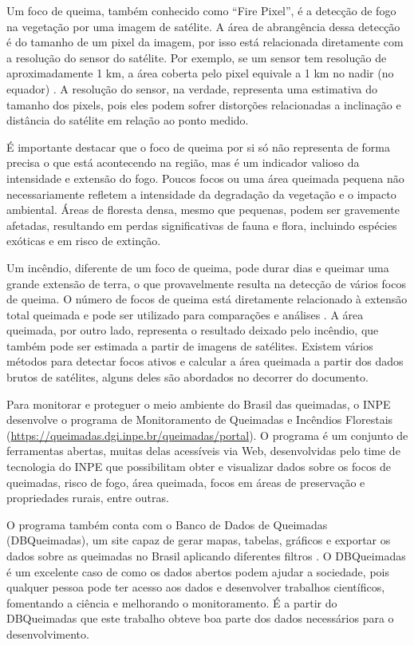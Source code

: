 \documentclass[cic,tc]{iiufrgs}
\begin{document}
Um foco de queima, também conhecido como ``Fire Pixel'', é a detecção de fogo na vegetação por uma imagem de satélite. A área de abrangência dessa detecção é do tamanho de um pixel da imagem, por isso está relacionada diretamente com a resolução do sensor do satélite. Por exemplo, se um sensor tem resolução de aproximadamente 1 km, a área coberta pelo pixel equivale a 1 km no nadir (no equador) \cite{PerguntasFrequentesINPE}. A resolução do sensor, na verdade, representa uma estimativa do tamanho dos pixels, pois eles podem sofrer distorções relacionadas a inclinação e distância do satélite em relação ao ponto medido. 

É importante destacar que o foco de queima por si só não representa de forma precisa o que está acontecendo na região, mas é um indicador valioso da intensidade e extensão do fogo. Poucos focos ou uma área queimada pequena não necessariamente refletem a intensidade da degradação da vegetação e o impacto ambiental. Áreas de floresta densa, mesmo que pequenas, podem ser gravemente afetadas, resultando em perdas significativas de fauna e flora, incluindo espécies exóticas e em risco de extinção.

Um incêndio, diferente de um foco de queima, pode durar dias e queimar uma grande extensão de terra, o que provavelmente resulta na detecção de vários focos de queima. O número de focos de queima está diretamente relacionado à extensão total queimada e pode ser utilizado para comparações e análises \citep{giglio2010assessing}. A área queimada, por outro lado, representa o resultado deixado pelo incêndio, que também pode ser estimada a partir de imagens de satélites. Existem vários métodos para detectar focos ativos e calcular a área queimada a partir dos dados brutos de satélites, alguns deles são abordados no decorrer do documento. 

Para monitorar e proteguer o meio ambiente do Brasil das queimadas, o INPE desenvolve o programa de Monitoramento de Queimadas e Incêndios Florestais (\url{https://queimadas.dgi.inpe.br/queimadas/portal}). O programa é um conjunto de ferramentas abertas, muitas delas acessíveis via Web, desenvolvidas pelo time de tecnologia do INPE que possibilitam obter e visualizar dados sobre os focos de queimadas, risco de fogo, área queimada, focos em áreas de preservação e propriedades rurais, entre outras.

O programa também conta com o Banco de Dados de Queimadas (DBQueimadas), um site capaz de gerar mapas, tabelas, gráficos e exportar os dados sobre as queimadas no Brasil aplicando diferentes filtros \citep{setzer2019banco}. O DBQueimadas é um excelente caso de como os dados abertos podem ajudar a sociedade, pois qualquer pessoa pode ter acesso aos dados e desenvolver trabalhos científicos, fomentando a ciência e melhorando o monitoramento. É a partir do DBQueimadas que este trabalho obteve boa parte dos dados necessários para o desenvolvimento.
\end{document}
